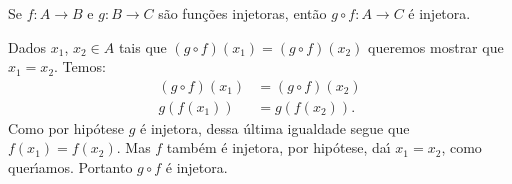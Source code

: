 \documentclass{beamer}
\begin{document}
    \begin{frame}
        \begin{proposicao}
    Se $f : A \to B$ e $g : B \to C$ s{\~a}o fun{\c c}{\~o}es injetoras, ent{\~a}o $g\circ f : A \to C$ {\'e} injetora.
\end{proposicao}
\begin{prova}
    Dados $x_1$, $x_2 \in A$ tais que $(g\circ f)(x_1) = (g\circ f)(x_2)$ queremos mostrar que $x_1 = x_2$. Temos:
    \begin{align*}
        (g\circ f)(x_1) &= (g\circ f)(x_2)\\
        g(f(x_1)) &= g(f(x_2)).
    \end{align*}
    Como por hip\'otese $g$ \'e injetora, dessa \'ultima igualdade segue que $f(x_1) = f(x_2)$. Mas $f$ tamb\'em \'e injetora, por hip\'otese, da{\'\i} $x_1 = x_2$, como quer{\'\i}amos. Portanto $g\circ f$ \'e injetora.
\end{prova}
    \end{frame}
\end{document}
